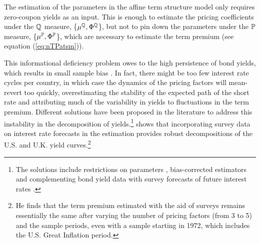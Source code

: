 {The estimation of the parameters in the affine term structure model only  requires zero-coupon yields as an input.
This is enough to estimate the pricing coefficients under the \(\mathbb{Q}\) measure,
\{\(\mu^{\mathbb{Q}}, \Phi^{\mathbb{Q}}\)\}, but not to pin down the parameters under the \(\mathbb{P}\) measure, 
\{\(\mu^{\mathbb{P}}, \Phi^{\mathbb{P}}\)\}, which are necessary to estimate the term premium (see equation (\ref{eq:nTPatsm})).

This informational deficiency problem owes to the high persistence of bond yields, which results in small sample bias \citep{KimOrphanides:2012}. 
In fact, there might be too few interest rate cycles per country, in which case the dynamics of the pricing factors will mean-revert too quickly, overestimating the stability of the expected path of the short rate and attributing much of the variability in yields to fluctuations in the term premium.
Different solutions have been proposed in the literature to address this instability in the decomposition of yields.\footnote{ The solutions include restrictions on parameters \citep{Duffee:2010}, bias-corrected estimators \citep{BRW:2012} and complementing bond yield data with survey forecasts of future interest rates \citep{KimWright:2005,KimOrphanides:2012}.} 
\cite{Guimaraes:2014} shows that incorporating survey data on interest rate forecasts in the estimation provides robust decompositions of the U.S. and U.K. yield curves.\footnote{ He finds that the term premium estimated with the aid of surveys remains essentially the same after varying the number of pricing factors (from 3 to 5) and the sample periods, even with a sample starting in 1972, which includes the U.S. Great Inflation period.} 

}
